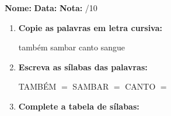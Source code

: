 \begin{exercicio}



\noindent\textbf{Nome:} \underline{\hspace{3.2cm}} \quad \textbf{Data:} \underline{\hspace{1.6cm}} \quad \textbf{Nota:} \underline{\hspace{0.9cm}}/10


\begin{enumerate}

  \item \textbf{Copie as palavras em letra cursiva:}
  \begin{center}
  também \quad sambar \quad canto \quad sangue
  \end{center}
  \begin{center}
  \underline{\hspace{2.4cm}} \quad \underline{\hspace{2.4cm}} \quad \underline{\hspace{2.4cm}} \quad \underline{\hspace{2.4cm}}
  \end{center}

  \item \textbf{Escreva as sílabas das palavras:}
  \begin{center}
  TAMBÉM $=$ \underline{\hspace{1.5cm}} \underline{\hspace{1.5cm}} \quad SAMBAR $=$ \underline{\hspace{1.5cm}} \underline{\hspace{1.5cm}} \quad CANTO $=$ \underline{\hspace{1.5cm}} \underline{\hspace{1.5cm}}
  \end{center}

  \item \textbf{Complete a tabela de sílabas:}

\begin{center}
\end{center}


\end{enumerate}
\end{exercicio}

